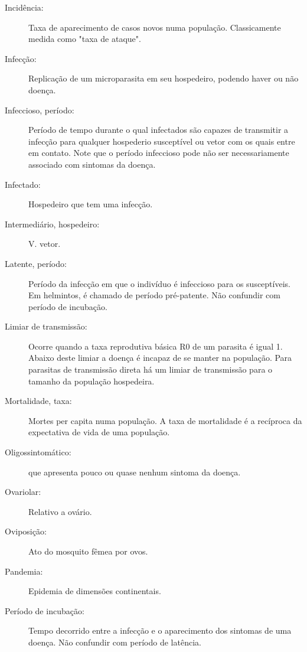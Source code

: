 \begin{description}
\item[Incidência:] Taxa de aparecimento de casos novos numa população. Classicamente medida como "taxa de ataque".

\item[Infecção:] Replicação de um microparasita em seu hospedeiro, podendo haver ou não doença.

\item[Infeccioso, período:] Período de tempo durante o qual infectados são capazes de transmitir a infecção para qualquer hospederio susceptível ou vetor com os quais entre em contato. Note que o período infeccioso pode não ser necessariamente associado com sintomas da doença.

\item[Infectado:] Hospedeiro que tem uma infecção.

\item[Intermediário, hospedeiro:] V. vetor.

\item[Latente, período:] Período da infecção em que o indivíduo é infeccioso para os susceptíveis. Em helmintos, é chamado de período pré-patente. Não confundir com período de incubação.

\item[Limiar de transmissão:]  Ocorre quando a taxa reprodutiva básica R0 de um parasita é igual 1. Abaixo deste limiar a doença é incapaz de se manter na população. Para parasitas de transmissão direta há um limiar de transmissão para o tamanho da população hospedeira.

\item[Mortalidade, taxa:] Mortes per capita numa população. A taxa de mortalidade é a recíproca da expectativa de vida de uma população.

\item[Oligossintomático:] que apresenta pouco ou quase nenhum sintoma da doença.

\item[Ovariolar:] Relativo a ovário.

\item[Oviposição:] Ato do mosquito fêmea por ovos.

\item[Pandemia:] Epidemia de dimensões continentais.

\item[Período de incubação:] Tempo decorrido entre a infecção e o aparecimento dos sintomas de uma doença. Não confundir com período de latência.


\end{description}
